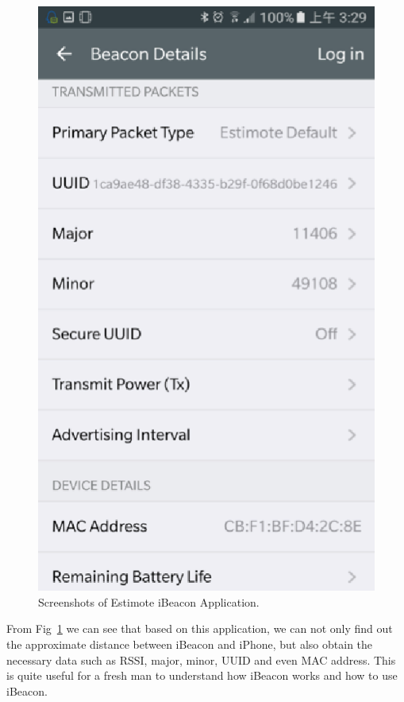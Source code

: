 \documentclass[12pt]{report}
\begin{document}
\begin{figure}[!t]
{\begin{minipage}[htb]{0.35\textwidth}
			\includegraphics[width = \textwidth]{pictures/3_4d.eps}
		\end{minipage}
	}
	\caption{Screenshots of Estimote iBeacon Application.}
	\label{fig: 3.4}
\end{figure}

From Fig~\ref{fig: 3.4} we can see that based on this application, we can not only find out the approximate distance between iBeacon and iPhone, but also obtain the necessary data such as RSSI, major, minor, UUID and even MAC address. This is quite useful for a fresh man to understand how iBeacon works and how to use iBeacon.
\end{document}
